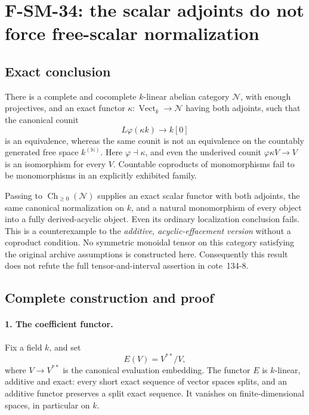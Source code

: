 \section{F-SM-34: the scalar adjoints do not force free-scalar normalization}

\subsection{Exact conclusion}
There is a complete and cocomplete \(k\)-linear abelian
category \(\mathcal N\), with enough projectives, and an exact
functor \(\kappa:\operatorname{Vect}_k\to\mathcal N\) having
both adjoints, such that the canonical counit
\[
              L\varphi(\kappa k)\longrightarrow k[0]
\]
is an equivalence, whereas the same counit is not an equivalence
on the countably generated free space \(k^{(\mathbb N)}\).
Here \(\varphi\dashv\kappa\), and even the underived
counit \(\varphi\kappa V\to V\) is an isomorphism for every
\(V\).  Countable coproducts of monomorphisms fail to be
monomorphisms in an explicitly exhibited family.

Passing to \(\operatorname{Ch}_{\ge0}(\mathcal N)\) supplies
an exact scalar functor with both adjoints, the same canonical
normalization on \(k\), and a natural monomorphism of every
object into a fully derived-acyclic object.  Even its ordinary
localization conclusion fails.  This is a counterexample to
the \emph{additive, acyclic-effacement version} without a
coproduct condition.  No symmetric monoidal tensor on this
category satisfying the original archive assumptions is
constructed here.  Consequently this result does not refute
the full tensor-and-interval assertion in cote~134-8.

\subsection{Complete construction and proof}

\paragraph{1. The coefficient functor.}
Fix a field \(k\), and set
\[
                       E(V)=V^{**}/V,
\]
where \(V\to V^{**}\) is the canonical evaluation embedding.
The functor \(E\) is \(k\)-linear, additive and exact:
every short exact sequence of vector spaces splits, and an
additive functor preserves a split exact sequence.
It vanishes on finite-dimensional spaces, in particular on
\(k\).

